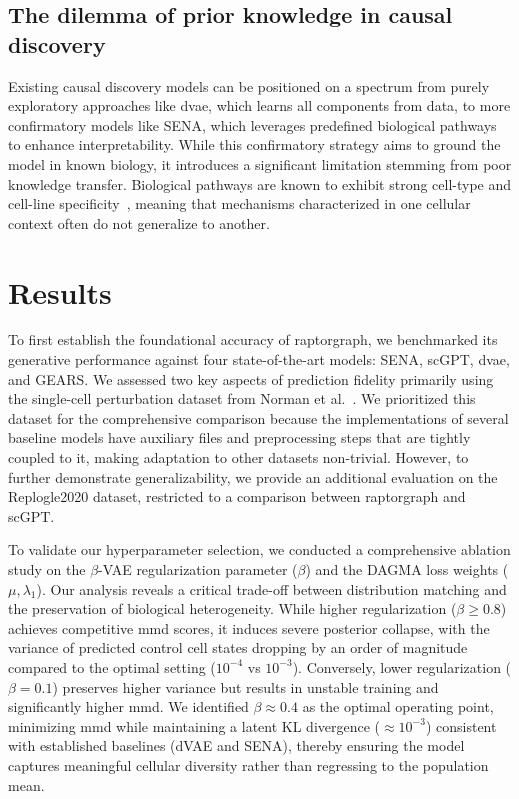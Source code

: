 \documentclass[10pt,letterpaper]{article}
\theoremstyle{definition}
\theoremstyle{remark}
\begin{document}
\subsection*{The dilemma of prior knowledge in causal discovery}
Existing causal discovery models can be positioned on a spectrum from purely exploratory approaches like \gls{dvae}, which learns all components from data, to more confirmatory models like SENA, which leverages predefined biological pathways to enhance interpretability. While this confirmatory strategy aims to ground the model in known biology, it introduces a significant limitation stemming from poor knowledge transfer. Biological pathways are known to exhibit strong cell-type and cell-line specificity~\cite{schneider2017tissue,gamazon2018using,walter2019biological,hekselman2020mechanisms}, meaning that mechanisms characterized in one cellular context often do not generalize to another.




\section*{Results}
To first establish the foundational accuracy of \gls{raptorgraph}, we benchmarked its generative performance against four state-of-the-art models: SENA, scGPT, \gls{dvae}, and GEARS.
We assessed two key aspects of prediction fidelity primarily using the single-cell perturbation dataset from Norman et al.~\cite{norman2019exploring}.
We prioritized this dataset for the comprehensive comparison because the implementations of several baseline models have auxiliary files and preprocessing steps that are tightly coupled to it, making adaptation to other datasets non-trivial.
However, to further demonstrate generalizability, we provide an additional evaluation on the Replogle2020 dataset, restricted to a comparison between \gls{raptorgraph} and scGPT.

To validate our hyperparameter selection, we conducted a comprehensive ablation study on the $\beta$-VAE regularization parameter ($\beta$) and the DAGMA loss weights ($\mu, \lambda_1$).
Our analysis reveals a critical trade-off between distribution matching and the preservation of biological heterogeneity.
While higher regularization ($\beta \geq 0.8$) achieves competitive \gls{mmd} scores, it induces severe posterior collapse, with the variance of predicted control cell states dropping by an order of magnitude compared to the optimal setting ($10^{-4}$ vs $10^{-3}$).
Conversely, lower regularization ($\beta = 0.1$) preserves higher variance but results in unstable training and significantly higher \gls{mmd}.
We identified $\beta \approx 0.4$ as the optimal operating point, minimizing \gls{mmd} while maintaining a latent KL divergence ($\approx 10^{-3}$) consistent with established baselines (dVAE and SENA), thereby ensuring the model captures meaningful cellular diversity rather than regressing to the population mean.
\end{document}
